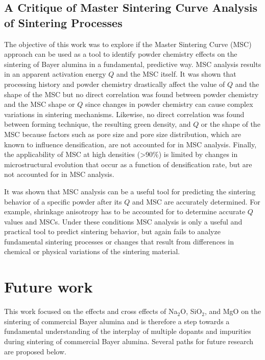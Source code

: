 \subsection{A Critique of Master Sintering Curve Analysis of Sintering Processes}
The objective of this work was to explore if the Master Sintering Curve (MSC) approach can be used as a tool to identify powder chemistry effects on the sintering of Bayer alumina in a fundamental, predictive way. MSC analysis results in an apparent activation energy $Q$ and the MSC itself. It was shown that processing history and powder chemistry drastically affect the value of $Q$ and the shape of the MSC but no direct correlation was found between powder chemistry and the MSC shape or $Q$ since changes in powder chemistry can cause complex variations in sintering mechanisms. Likewise, no direct correlation was found between forming technique, the resulting green density, and $Q$ or the shape of the MSC because factors such as pore size and pore size distribution, which are known to influence densification, are not accounted for in MSC analysis. Finally, the applicability of MSC at high densities (>90\%) is limited by changes in microstructural evolution that occur as a function of densification rate, but are not accounted for in MSC analysis.

It was shown that MSC analysis can be a useful tool for predicting the sintering behavior of a specific powder after its $Q$ and MSC are accurately determined. For example, shrinkage anisotropy has to be accounted for to determine accurate $Q$ values and MSCs. Under these conditions MSC analysis is only a useful and practical tool to predict sintering behavior, but again fails to analyze fundamental sintering processes or changes that result from differences in chemical or physical variations of the sintering material.

\section{Future work}
This work focused on the effects and cross effects of Na$_{2}$O, SiO$_{2}$, and MgO on the sintering of commercial Bayer alumina and is therefore a step towards a fundamental understanding of the interplay of multiple dopants and impurities during sintering of commercial Bayer alumina. Several paths for future research are proposed below.

